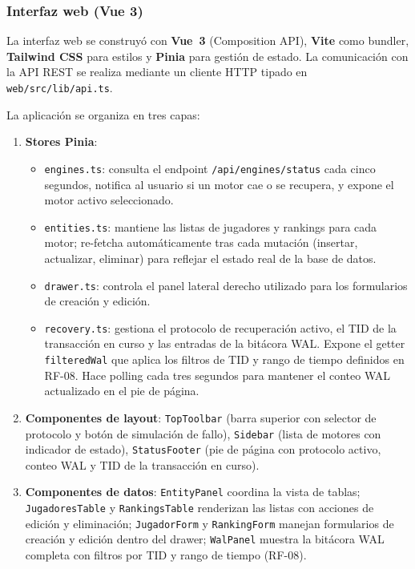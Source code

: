\documentclass[12pt,letterpaper]{article}
\begin{document}
\subsubsection{Interfaz web (Vue 3)}

La interfaz web se construyó con \textbf{Vue~3} (Composition API), \textbf{Vite} como
bundler, \textbf{Tailwind CSS} para estilos y \textbf{Pinia} para gestión de estado. La
comunicación con la API REST se realiza mediante un cliente HTTP tipado en
\texttt{web/src/lib/api.ts}.

La aplicación se organiza en tres capas:

\begin{enumerate}[leftmargin=2em]
  \item \textbf{Stores Pinia}:
        \begin{itemize}
          \item \texttt{engines.ts}: consulta el endpoint \texttt{/api/engines/status} cada
                cinco segundos, notifica al usuario si un motor cae o se recupera, y expone
                el motor activo seleccionado.
          \item \texttt{entities.ts}: mantiene las listas de jugadores y rankings para cada
                motor; re-fetcha automáticamente tras cada mutación (insertar, actualizar,
                eliminar) para reflejar el estado real de la base de datos.
          \item \texttt{drawer.ts}: controla el panel lateral derecho utilizado para los
                formularios de creación y edición.
          \item \texttt{recovery.ts}: gestiona el protocolo de recuperación activo, el TID
                de la transacción en curso y las entradas de la bitácora WAL. Expone el
                getter \texttt{filteredWal} que aplica los filtros de TID y rango de
                tiempo definidos en RF-08. Hace polling cada tres segundos para mantener
                el conteo WAL actualizado en el pie de página.
        \end{itemize}
  \item \textbf{Componentes de layout}: \texttt{TopToolbar} (barra superior con selector de
        protocolo y botón de simulación de fallo), \texttt{Sidebar} (lista de motores con
        indicador de estado), \texttt{StatusFooter} (pie de página con protocolo activo,
        conteo WAL y TID de la transacción en curso).
  \item \textbf{Componentes de datos}: \texttt{EntityPanel} coordina la vista de tablas;
        \texttt{JugadoresTable} y \texttt{RankingsTable} renderizan las listas con acciones
        de edición y eliminación; \texttt{JugadorForm} y \texttt{RankingForm} manejan
        formularios de creación y edición dentro del drawer; \texttt{WalPanel} muestra la
        bitácora WAL completa con filtros por TID y rango de tiempo (RF-08).
\end{enumerate}
\end{document}
